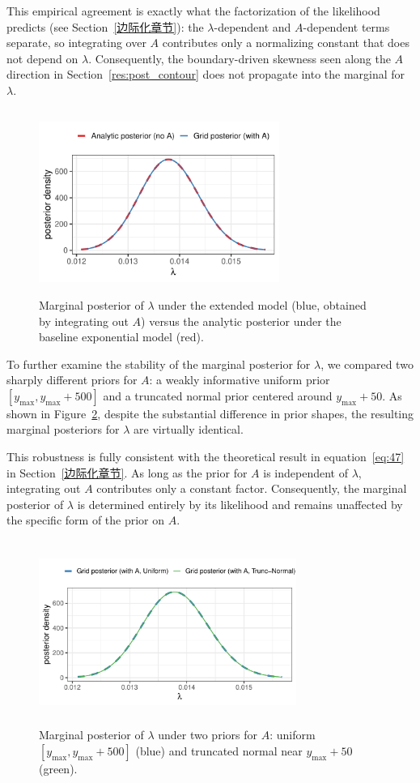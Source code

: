 This empirical agreement is exactly what the factorization of the likelihood predicts (see Section~\ref{边际化章节}): the $\lambda$-dependent and $A$-dependent terms separate, so integrating over $A$ contributes only a normalizing constant that does not depend on $\lambda$. Consequently, the boundary-driven skewness seen along the $A$ direction in Section~\ref{res:post_contour} does not propagate into the marginal for $\lambda$.

\begin{figure}[H]
    \centering
    \includegraphics[height=6cm, width=0.7\textwidth]{images/lambda_marginal_compare.pdf}
    \caption{{\small Marginal posterior of $\lambda$ under the extended model (blue, obtained by integrating out $A$) versus the analytic posterior under the baseline exponential model (red).}}
    \label{fig:marginal}
\end{figure}
To further examine the stability of the marginal posterior for $\lambda$, we compared two sharply different priors for $A$: a weakly informative uniform prior $[y_{\max}, y_{\max}+500]$ and a truncated normal prior centered around $y_{\max}+50$. As shown in Figure~\ref{fig:diff_A_marginal}, despite the substantial difference in prior shapes, the resulting marginal posteriors for $\lambda$ are virtually identical.

This robustness is fully consistent with the theoretical result in equation~\eqref{eq:47} in Section~\ref{边际化章节}. As long as the prior for $A$ is independent of $\lambda$, integrating out $A$ contributes only a constant factor. Consequently, the marginal posterior of $\lambda$ is determined entirely by its likelihood and remains unaffected by the specific form of the prior on $A$.
\begin{figure}[H]
    \centering
    \includegraphics[height=6cm, width=0.75\textwidth]{images/diff_A_prior_marginal_compare.pdf}
    \caption{{\small Marginal posterior of $\lambda$ under two priors for $A$: uniform $[y_{\max}, y_{\max}+500]$ (blue) and truncated normal near $y_{\max}+50$ (green).}}
    \label{fig:diff_A_marginal}
\end{figure}
